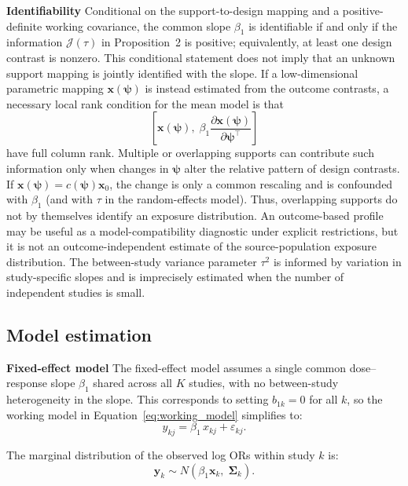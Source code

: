 \documentclass[journal=rsm]{CUP-JNL-DTM}%
\theoremstyle{definition}
\numberwithin{equation}{section}
\begin{document}
\noindent\textbf{Identifiability} \label{sec:identifiability}
Conditional on the support-to-design mapping and a positive-definite working
covariance, the common slope $\beta_1$ is identifiable if and only if the
information $\mathcal J(\tau)$ in Proposition~2 is positive; equivalently, at
least one design contrast is nonzero. This conditional statement does not imply
that an unknown support mapping is jointly identified with the slope. If a
low-dimensional parametric mapping $\mathbf x(\boldsymbol\psi)$ is instead
estimated from the outcome contrasts, a necessary local rank condition for the
mean model is that
\[
 \left[\mathbf x(\boldsymbol\psi),\;
 \beta_1\frac{\partial\mathbf x(\boldsymbol\psi)}
 {\partial\boldsymbol\psi^\top}\right]
\]
have full column rank. Multiple or overlapping supports can contribute such
information only when changes in $\boldsymbol\psi$ alter the relative pattern
of design contrasts. If
$\mathbf x(\boldsymbol\psi)=c(\boldsymbol\psi)\mathbf x_0$, the change is only
a common rescaling and is confounded with $\beta_1$ (and with $\tau$ in the
random-effects model). Thus, overlapping supports do not by themselves identify
an exposure distribution. An outcome-based profile may be useful as a
model-compatibility diagnostic under explicit restrictions, but it is not an
outcome-independent estimate of the source-population exposure distribution.
The between-study variance parameter
$\tau^2$ is informed by variation in study-specific slopes and is imprecisely
estimated when the number of independent studies is small.


\subsection{Model estimation} \label{model_estimation}

\noindent\textbf{Fixed-effect model}
The fixed-effect model assumes a single common dose--response slope $\beta_1$ shared across all $K$ studies, with no between-study heterogeneity in the slope. This corresponds to setting $b_{1k} = 0$ for all $k$, so the working model in Equation~\eqref{eq:working_model} simplifies to:
\[
  y_{kj} = \beta_1\, x_{kj} + \varepsilon_{kj}.
\]

The marginal distribution of the observed log ORs within study $k$ is:
%
\begin{equation}
  \mathbf{y}_k \sim N\!\left(
    \beta_1 \mathbf{x}_k,\; \boldsymbol{\Sigma}_k
  \right).
  \label{eq:marginal_fe}
\end{equation}
 
\end{document}
